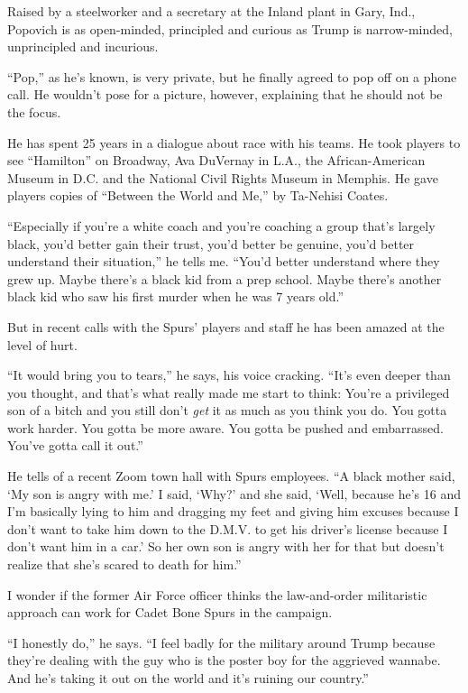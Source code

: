 Raised by a steelworker and a secretary at the Inland plant in Gary,
Ind., Popovich is as open-minded, principled and curious as Trump is
narrow-minded, unprincipled and incurious.

``Pop,'' as he's known, is very private, but he finally agreed to pop
off on a phone call. He wouldn't pose for a picture, however, explaining
that he should not be the focus.

He has spent 25 years in a dialogue about race with his teams. He took
players to see ``Hamilton'' on Broadway, Ava DuVernay in L.A., the
African-American Museum in D.C. and the National Civil Rights Museum in
Memphis. He gave players copies of ``Between the World and Me,'' by
Ta-Nehisi Coates.

``Especially if you're a white coach and you're coaching a group that's
largely black, you'd better gain their trust, you'd better be genuine,
you'd better understand their situation,'' he tells me. ``You'd better
understand where they grew up. Maybe there's a black kid from a prep
school. Maybe there's another black kid who saw his first murder when he
was 7 years old.''

But in recent calls with the Spurs' players and staff he has been amazed
at the level of hurt.

``It would bring you to tears,'' he says, his voice cracking. ``It's
even deeper than you thought, and that's what really made me start to
think: You're a privileged son of a bitch and you still don't \emph{get}
it as much as you think you do. You gotta work harder. You gotta be more
aware. You gotta be pushed and embarrassed. You've gotta call it out.''

He tells of a recent Zoom town hall with Spurs employees. ``A black
mother said, `My son is angry with me.' I said, `Why?' and she said,
`Well, because he's 16 and I'm basically lying to him and dragging my
feet and giving him excuses because I don't want to take him down to the
D.M.V. to get his driver's license because I don't want him in a car.'
So her own son is angry with her for that but doesn't realize that she's
scared to death for him.''

I wonder if the former Air Force officer thinks the law-and-order
militaristic approach can work for Cadet Bone Spurs in the campaign.

``I honestly do,'' he says. ``I feel badly for the military around Trump
because they're dealing with the guy who is the poster boy for the
aggrieved wannabe. And he's taking it out on the world and it's ruining
our country.''

